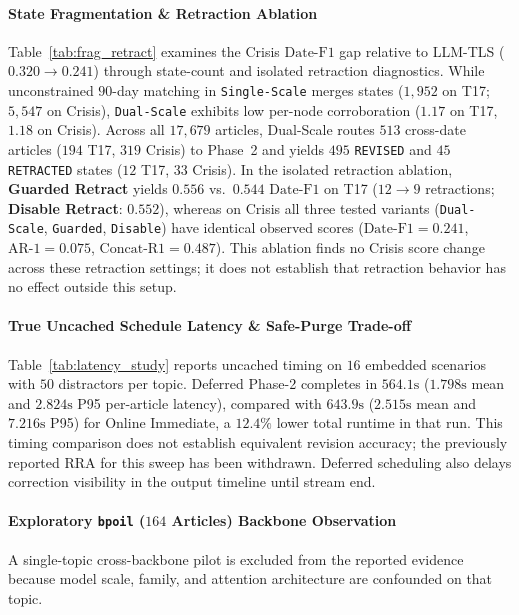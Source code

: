 \documentclass[journal]{IEEEtran}
\begin{document}
\paragraph{State Fragmentation \& Retraction Ablation}
Table~\ref{tab:frag_retract} examines the Crisis $\text{Date-F1}$ gap relative to LLM-TLS ($0.320 \to 0.241$) through state-count and isolated retraction diagnostics. While unconstrained $90$-day matching in \texttt{Single-Scale} merges states ($1{,}952$ on T17; $5{,}547$ on Crisis), \texttt{Dual-Scale} exhibits low per-node corroboration ($1.17$ on T17, $1.18$ on Crisis). Across all $17{,}679$ articles, Dual-Scale routes $513$ cross-date articles ($194$ T17, $319$ Crisis) to Phase~2 and yields $495$ \texttt{REVISED} and $45$ \texttt{RETRACTED} states ($12$ T17, $33$ Crisis). In the isolated retraction ablation, \textbf{Guarded Retract} yields $0.556$ vs.\ $0.544$ $\text{Date-F1}$ on T17 ($12 \to 9$ retractions; \textbf{Disable Retract}: $0.552$), whereas on Crisis all three tested variants (\texttt{Dual-Scale}, \texttt{Guarded}, \texttt{Disable}) have identical observed scores ($\text{Date-F1}=0.241$, $\text{AR-1}=0.075$, $\text{Concat-R1}=0.487$). This ablation finds no Crisis score change across these retraction settings; it does not establish that retraction behavior has no effect outside this setup.

\paragraph{True Uncached Schedule Latency \& Safe-Purge Trade-off}
Table~\ref{tab:latency_study} reports uncached timing on $16$ embedded scenarios with $50$ distractors per topic. Deferred Phase-2 completes in $564.1\text{s}$ ($1.798\text{s}$ mean and $2.824\text{s}$ P95 per-article latency), compared with $643.9\text{s}$ ($2.515\text{s}$ mean and $7.216\text{s}$ P95) for Online Immediate, a $12.4\%$ lower total runtime in that run. This timing comparison does not establish equivalent revision accuracy; the previously reported RRA for this sweep has been withdrawn. Deferred scheduling also delays correction visibility in the output timeline until stream end.

\paragraph{Exploratory \texttt{bpoil} ($164$ Articles) Backbone Observation}
A single-topic cross-backbone pilot is excluded from the reported evidence because model scale, family, and attention architecture are confounded on that topic.
\end{document}
